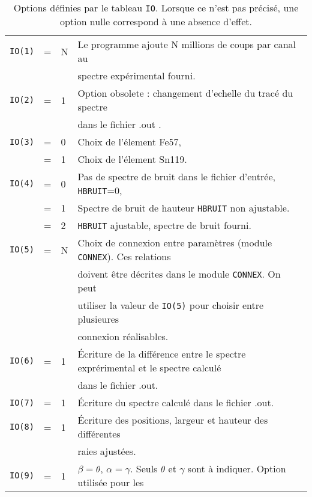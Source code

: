 \begin{table}
\caption{\label{tab:IO} Options définies par le tableau \lstinline{IO}. Lorsque ce n'est pas précisé, une option nulle correspond à une absence d'effet.}
\begin{tabular}{|rcl|l|}
\hline
\lstinline{IO(1)} &=& N & Le programme ajoute N millions de coups par canal au \\
                  & &    & spectre expérimental fourni.\\
\hline
\lstinline{IO(2)} &=& 1 & Option obsolete : changement d'echelle du tracé du spectre \\
                  & &   & dans le fichier .out .  \\
\hline
\lstinline{IO(3)} &=& 0 & Choix de l'élement Fe57,\\
                  &=& 1 & Choix de l'élement Sn119. \\
\hline
\lstinline{IO(4)} &=& 0 & Pas de spectre de bruit dans le fichier d'entrée, \lstinline{HBRUIT}=0, \\
                  &=& 1 & Spectre de bruit de hauteur \lstinline{HBRUIT} non ajustable. \\
                  &=& 2 & \lstinline{HBRUIT} ajustable, spectre de bruit fourni.\\
\hline  
\lstinline{IO(5)} &=& N & Choix de connexion entre paramètres (module \lstinline{CONNEX}). Ces relations\\
                  & &  & doivent être décrites dans le module \lstinline{CONNEX}. On peut \\
                  & &  & utiliser la valeur de \lstinline{IO(5)}  pour choisir entre plusieures \\
                  & &  & connexion réalisables.\\
\hline  
\lstinline{IO(6)} &=& 1 & \'Ecriture de la différence entre le spectre exprérimental et le spectre calculé\\
                  & &  & dans le fichier .out.\\
\hline  
\lstinline{IO(7)} &=& 1 & \'Ecriture du spectre calculé dans le fichier .out.\\
\hline
\lstinline{IO(8)} &=& 1 & \'Ecriture des positions, largeur et hauteur des différentes\\
                  & &   & raies ajustées. \\
\hline  
\lstinline{IO(9)} &=& 1 & $\beta=\theta$, $\alpha=\gamma$. Seuls $\theta$ et  $\gamma$ sont à indiquer. Option utilisée pour les \\

\end{tabular}
\end{table}
